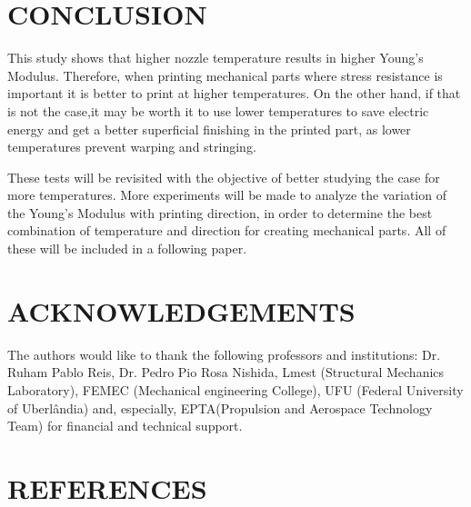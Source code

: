 \documentclass[10pt,fleqn,a4paper,twoside]{article}
\begin{document}
\section{CONCLUSION}
This study shows that higher nozzle temperature results in higher Young's Modulus. Therefore, when printing mechanical parts where stress resistance is important it is better to print at higher temperatures. On the other hand, if that is not the case,it may be worth it to use lower temperatures to save electric energy and get a better superficial finishing in the printed part, as lower temperatures prevent warping and stringing. 

These tests will be revisited with the objective of better studying the case for more temperatures. 
More experiments will be made to analyze the variation of the Young's Modulus with printing direction, in order to determine the best combination of temperature and direction for creating mechanical parts. All of these will be included in a following paper. 







\section{ACKNOWLEDGEMENTS}
The authors would like to thank the following professors and institutions: Dr. Ruham Pablo Reis, Dr. Pedro Pio Rosa Nishida, Lmest (Structural Mechanics Laboratory), FEMEC (Mechanical engineering College), UFU (Federal University of Uberl\^andia) and, especially, EPTA(Propulsion and Aerospace Technology Team) for financial and technical support.




\section{REFERENCES} 


\renewcommand{\refname}{}

\end{document}
